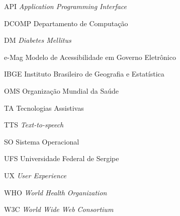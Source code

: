 
\begin{siglas}
  	\item[API]{\textit{Application Programming Interface}}
  	\item[DCOMP]{Departamento de Computação}
  	\item[DM]{\textit{Diabetes Mellitus}}
  	\item[e-Mag]{Modelo de Acessibilidade em Governo Eletrônico}
  	\item[IBGE]{Instituto Brasileiro de Geografia e Estatística}
  	\item[OMS]{Organização Mundial da Saúde}
  	\item[TA]{Tecnologias Assistivas}
  	\item[TTS]{\textit{Text-to-speech}}
  	\item[SO]{Sistema Operacional}
	\item[UFS]{Universidade Federal de Sergipe}
  	\item[UX]{\textit{User Experience}}
  	\item[WHO]{\textit{World Health Organization}}
  	\item[W3C]{\textit{World Wide Web Consortium}}
\end{siglas}